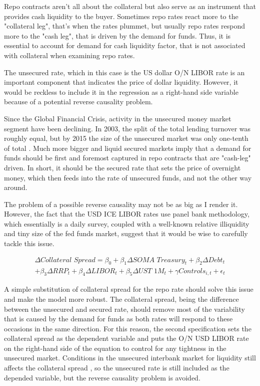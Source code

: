 \documentclass[11pt,a4paper,english,oneside]{article}
\begin{document}
Repo contracts aren't all about the collateral but also serve as an instrument that provides cash liquidity to the buyer. Sometimes repo rates react more to the "collateral leg", that's when the rates plummet, but usually repo rates respond more to the "cash leg", that is driven by the demand for funds. Thus, it is essential to account for demand for cash liquidity factor, that is not associated with collateral when examining repo rates.

The unsecured rate, which in this case is the US dollar O/N LIBOR rate is an important component that indicates the price of dollar liquidity. However, it would be reckless to include it in the regression as a right-hand side variable because of a potential reverse causality problem.

Since the Global Financial Crisis, activity in the unsecured money market segment have been declining. In 2003, the split of the total lending turnover was roughly equal, but by 2015 the size of the unsecured market was only one-tenth of total \citet{fiore2018}. Much more bigger and liquid secured markets imply that a demand for funds should be first and foremost captured in repo contracts that are "cash-leg" driven. In short, it should be the secured rate that sets the price of overnight money, which then feeds into the rate of unsecured funds, and not the other way around.

The problem of a possible reverse causality may not be as big as I render it. However, the fact that the USD ICE LIBOR rates use panel bank methodology, which essentially is a daily survey, coupled with a well-known relative illiquidity and tiny size of the fed funds market, suggest that it would be wise to carefully tackle this issue.

\begin{equation} \label{eq:2}
  \begin{gathered}
    \Delta \textit{Collateral Spread} = \beta_0 + \beta_1 \Delta \textit{SOMA Treasury}_t + \beta_2 \Delta \textit{Debt}_t \\ + \beta_3 \Delta \textit{RRP}_t + \beta_4 \Delta \textit{LIBOR}_t + \beta_5 \Delta \textit{UST 1M}_t + \gamma \textit{Controls}_{i,t} + \epsilon_{t}
  \end{gathered}
\end{equation}

A simple substitution of collateral spread for the repo rate should solve this issue and make the model more robust. The collateral spread, being the difference between the unsecured and secured rate, should remove most of the variability that is caused by the demand for funds as both rates will respond to these occasions in the same direction. For this reason, the second specification sets the collateral spread as the dependent variable and puts the O/N USD LIBOR rate on the right-hand side of the equation to control for any tightness in the unsecured market. Conditions in the unsecured interbank market for liquidity still affects the collateral spread \citet{nyborg2019a}, so the unsecured rate is still included as the depended variable, but the reverse causality problem is avoided.
\end{document}
